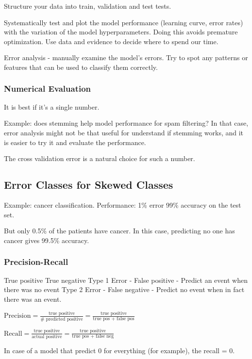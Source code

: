 Structure your data into train, validation and test tests. 

Systematically test and plot the model performance (learning curve, error rates) with the variation of the model hyperparameters. 
Doing this avoids premature optimization. Use data and evidence to decide where to spend our time. 

Error analysis - manually examine the model's errors. Try to spot any patterns or features that can be used to classify them correctly. 


\subsubsection{Numerical Evaluation}

It is best if it's a single number. 

Example: does stemming help model performance for spam filtering? 
In that case, error analysis might not be that useful for understand if stemming works, and it is easier to try it and evaluate the performance.

The cross validation error is a natural choice for such a number.

\subsection{Error Classes for Skewed Classes}

Example: cancer classification.
Performance: 1\% error 99\% accuracy on the test set.

But only 0.5\% of the patients have cancer. In this case, predicting no one has cancer gives 99.5\% accuracy.

\subsubsection{Precision-Recall}

True positive
True negative
Type 1 Error - False positive - Predict an event when there was no event
Type 2 Error - False negative - Predict no event when in fact there was an event.


$\text{Precision} = \frac{\text{true positive}}{\text{# predicted positive}} = \frac{\text{true positive}}{\text{true pos + false pos}}$

$\text{Recall} = \frac{\text{true positive}}{\text{actual positive}} = 
\frac{\text{true positive}}{\text{true pos + false neg}} $

In case of a model that predict 0 for everything (for example), the recall = 0. 

